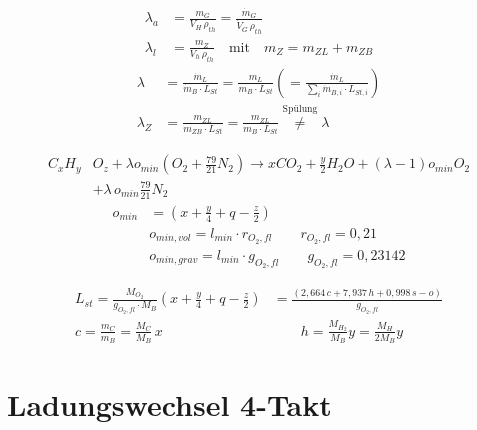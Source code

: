 \documentclass[english,threecolumn,color]{latex4ei/latex4ei_sheet}
\begin{document}
\begin{sectionbox}
	\begin{align*}
		\lambda_a &= \frac{m_G}{V_H \, \rho_{th}} = \frac{\dot{m}_G}{\dot{V}_G \, \rho_{th}}\\ \lambda_l&= \frac{m_Z}{V_h \, \rho_{th}} \quad \text{mit} \quad m_Z=m_{ZL}+m_{ZB}
	\end{align*}
	\begin{align*}
		\lambda&= \frac{\dot{m}_L}{\dot{m}_B \cdot L_{St}}=\frac{m_L}{m_B\cdot L_{St}}
		\left(=\frac{\dot{m}_L}{ \sum_{i} \dot{m}_{B,i} \cdot L_{St,i}} \right)\\
		\lambda_Z&=\frac{m_{ZL}}{m_{ZB}\cdot L_{St}}=\frac{m_{ZL}}{m_{B}\cdot L_{St}} \overset{\text{Spülung}}{\neq} \lambda
	\end{align*}
\end{sectionbox}
\begin{sectionbox}
	\begin{align*}
		C_xH_y&O_z + \lambda o_{min}\left(O_2 + \frac{79}{21}N_2\right)
		\rightarrow x CO_2 + \frac{y}{2}H_2O +\left(\lambda-1\right)o_{min} O_2\\
		&+\lambda \, o_{min} \frac{79}{21} N_2
	\end{align*}
	\begin{align*}
		o_{min}& =  \left(x + \frac{y}{4} + q - \frac{z}{2}\right)\\
		&o_{min, vol} =  l_{min} \cdot r_{O_2,fl} \qquad r_{O_2,fl}=0,21 \\
		&o_{min, grav} =  l_{min} \cdot g_{O_2,fl} \qquad g_{O_2,fl} = 0,23142
	\end{align*}
\end{sectionbox}
\begin{sectionbox}
	\begin{align*}
		L_{st}=\frac{M_{O_2}}{g_{O_2,fl} \cdot M_B}\left(x + \frac{y}{4} + q - \frac{z}{2}\right)&
		=\frac{\left(2,664\,c+7,937\,h+0,998\,s-o\right)}{g_{O_2,fl}}\\
		c=\frac{m_C}{m_B}= \frac{M_C}{M_B}\, x &\qquad h=\frac{M_{H_2}}{M_B} y=\frac{M_H}{2 M_B} y
	\end{align*}
\end{sectionbox}




\section{Ladungswechsel 4-Takt}
\end{document}
